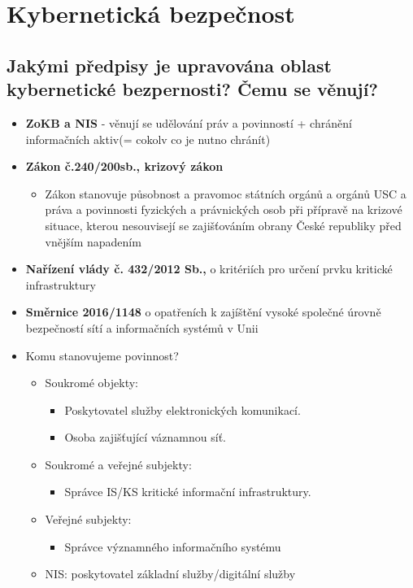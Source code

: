 \section{Kybernetická bezpečnost}

\subsection{Jakými předpisy je upravována oblast kybernetické bezpernosti? Čemu se věnují?}
\begin{itemize}

\item \textbf{ZoKB a NIS} - věnují se udělování práv a povinností + chránění informačních aktiv(= cokolv co je nutno chránít)
\item \textbf{Zákon č.240/200sb., krizový zákon}
    \begin{itemize}
        \item Zákon stanovuje působnost a pravomoc státních orgánů a orgánů USC a práva a povinnosti fyzických a právnických osob při přípravě na krizové situace, kterou nesouvisejí se zajišťováním obrany České republiky před vnějším napadením
    \end{itemize}
    \item \textbf{Nařízení vlády č. 432/2012 Sb.,} o kritériích pro určení prvku kritické infrastruktury
    \item \textbf{Směrnice 2016/1148} o opatřeních k zajíštění vysoké společné úrovně bezpečností sítí a informačních systémů v Unii
    \item Komu stanovujeme povinnost?
    \begin{itemize}
        \item Soukromé objekty:
        \begin{itemize}
            \item Poskytovatel služby elektronických komunikací.
            \item Osoba zajišťující váznamnou síť.
        \end{itemize}
        \item Soukromé a veřejné subjekty:
        \begin{itemize}
            \item Správce IS/KS kritické informační infrastruktury.
        \end{itemize}
        \item Veřejné subjekty:
        \begin{itemize}
            \item Správce významného informačního systému
        \end{itemize}
        \item NIS: poskytovatel základní služby/digitální služby
    \end{itemize}
\end{itemize}

